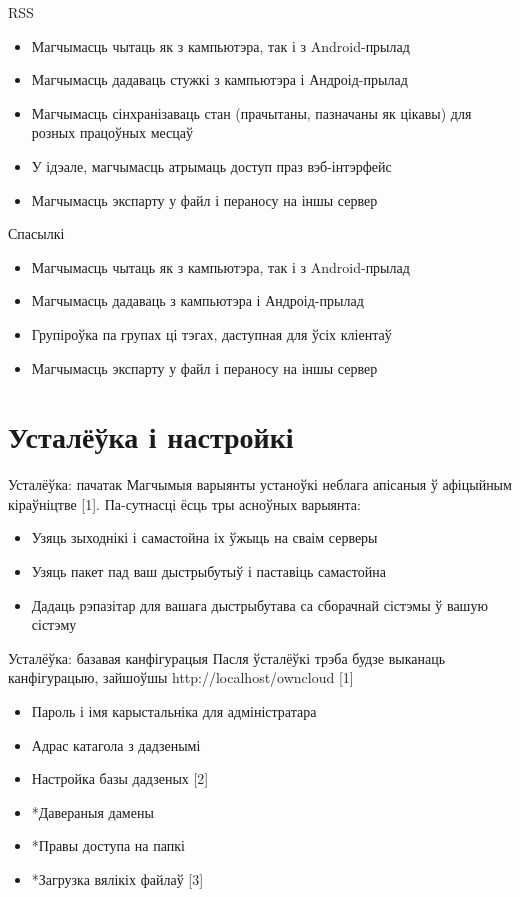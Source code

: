 \documentclass[ignorenonframetext,hyperref={pdftex,unicode}]{beamer}
\begin{document}
\begin{frame}{RSS}
	\begin{itemize}
		\item Магчымасць чытаць як з кампьютэра, так і з Android-прылад
		\item Магчымасць дадаваць стужкі з кампьютэра і Андроід-прылад
		\item Магчымасць сінхранізаваць стан (прачытаны, пазначаны як цікавы) для розных працоўных месцаў
		\item У ідэале, магчымасць атрымаць доступ праз вэб-інтэрфейс
		\item Магчымасць экспарту у файл і пераносу на іншы сервер
	\end{itemize}
\end{frame}

\begin{frame}{Спасылкі}
	\begin{itemize}
		\item Магчымасць чытаць як з кампьютэра, так і з Android-прылад
		\item Магчымасць дадаваць з кампьютэра і Андроід-прылад
		\item Групіроўка па групах ці тэгах, даступная для ўсіх кліентаў
		\item Магчымасць экспарту у файл і пераносу на іншы сервер
	\end{itemize}
\end{frame}

\section{Усталёўка і настройкі}
\begin{frame}{Усталёўка: пачатак}
	Магчымыя варыянты устаноўкі неблага апісаныя ў афіцыйным кіраўніцтве [1]. Па-сутнасці ёсць тры асноўных варыянта:
	\begin{itemize}
		\item Узяць зыходнікі і самастойна іх ўжыць на сваім серверы
		\item Узяць пакет пад ваш дыстрыбутыў і паставіць самастойна
		\item Дадаць рэпазітар для вашага дыстрыбутава са сборачнай сістэмы ў вашую сістэму
	\end{itemize}
\end{frame}

\begin{frame}{Усталёўка: базавая канфігурацыя}
	Пасля ўсталёўкі трэба будзе выканаць канфігурацыю, зайшоўшы http://localhost/owncloud [1]
	\begin{itemize}
		\item Пароль і імя карыстальніка для адміністратара
		\item Адрас катагола з дадзенымі
		\item Настройка базы дадзеных [2]
		\item *Давераныя дамены
		\item *Правы доступа на папкі
		\item *Загрузка вялікіх файлаў [3]
	\end{itemize}
\end{frame}
\end{document}
